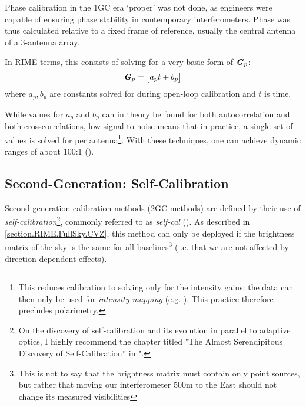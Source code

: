 \pg
Phase calibration in the 1GC era `proper' was not done, as engineers were capable of ensuring phase stability in contemporary interferometers. Phase was thus calculated relative to a fixed frame of reference, usually the central antenna of a 3-antenna array. 

\pg
In RIME terms, this consists of solving for a very basic form of $\textbf{\emph{G}}_p$:
\begin{equation}
\Gjones_p = \begin{bmatrix} a_p t + b_p \end{bmatrix} %
\end{equation}
where $a_p,b_p$ are constants solved for during open-loop calibration and $t$ is time. %

\pg
While values for $a_p$ and $b_p$ can in theory be found for both autocorrelation and both crosscorrelations, low signal-to-noise means that in practice, a single set of values is solved for per antenna\footnote{This reduces calibration to solving only for the intensity gains: the data can then only be used for \emph{intensity mapping} (e.g. ). This practice therefore precludes polarimetry.}. With these techniques, one can achieve dynamic ranges of about 100:1 ().

\subsection{Second-Generation: Self-Calibration}\label{section.calibration.2gc}

\pg
Second-generation calibration methods (2GC methods) are defined by their use of \emph{self-calibration}\footnote{On the discovery of self-calibration and its evolution in parallel to adaptive optics, I highly recommend the chapter titled "The Almost Serendipitous Discovery of Self-Calibration'' in "\href{http://library.nrao.edu/public/collection/02000000000280.pdf}{\citep{serendipitous}}.}, commonly referred to as \emph{self-cal} (). As described in \cref{section.RIME.FullSky.CVZ}, this method can only be deployed if the brightness matrix of the sky is the same for all baselines\footnote{This is not to say that the brightness matrix must contain only point sources, but rather that moving our interferometer 500m to the East should not change its measured visibilities} (i.e. that we are not affected by direction-dependent effects).

